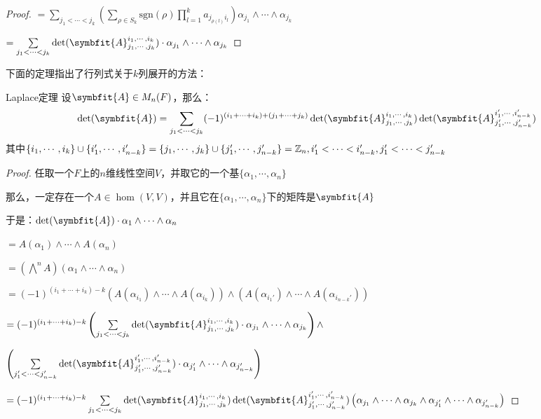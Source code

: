 \documentclass[12pt, a4paper, oneside, UTF8]{ctexbook}
\begin{document}
\begin{para}{0}
\begin{proof}
						$=\sum\limits_{j_1 < \cdots < j_k}\left(\sum\limits_{\rho \in S_k}\text{sgn}(\rho )\prod_{l=1}^{k} a_{j_{\rho(l)}i_l} \right) \alpha_{j_1}\wedge \cdots \wedge \alpha_{j_k}$

						$=\sum\limits_{j_1 < \cdots < j_k}\det(\symbfit{A}_{j_1,\cdots,j_k}^{i_1,\cdots,i_k})\cdot \alpha_{j_1} \wedge \cdots \wedge \alpha_{j_k}$
					\end{proof}
					下面的定理指出了行列式关于$k$列展开的方法：
					\begin{them}{Laplace定理}{}
						设$\symbfit{A} \in M_n(F)$，那么：
						\begin{equation}
							\det(\symbfit{A})=\sum\limits_{j_1 < \cdots < j_k} (-1)^{(i_1+\cdots+i_k)+(j_1+\cdots+j_k)}\det(\symbfit{A}_{j_1,\cdots,j_k}^{i_1,\cdots,i_k})\det(\symbfit{A}_{j_1',\cdots,j_{n-k}'}^{i_1',\cdots,i_{n-k}'})
						\end{equation}
						其中$\{i_1,\cdots,i_k\}\cup \{i_1',\cdots,i_{n-k}'\}=\{j_1,\cdots,j_k\}\cup\{j_1',\cdots,j_{n-k}'\}=\mathbb{Z}_n,i_1'<\cdots<i_{n-k}',j_1'<\cdots<j_{n-k}'$
					\end{them}
					\begin{proof}
						任取一个$F$上的$n$维线性空间$V$，并取它的一个基$\{\alpha_1,\cdots,\alpha_n\}$

						那么，一定存在一个$A \in \hom(V,V)$，并且它在$\{\alpha_1,\cdots,\alpha_n\}$下的矩阵是$\symbfit{A}$
						
						于是：$\det(\symbfit{A})\cdot \alpha_1\wedge \cdots \wedge \alpha_n$

						$=A(\alpha_1)\wedge \cdots \wedge A(\alpha_n)$

						$=\left(\bigwedge^n A\right)(\alpha_1 \wedge \cdots \wedge \alpha_n)$

						$=(-1)^{(i_1+\cdots+i_k)-k}\left(A(\alpha_{i_1})\wedge \cdots \wedge A(\alpha_{i_k})\right)\wedge\left(A(\alpha_{i_1'})\wedge \cdots \wedge A(\alpha_{i_{n-k}'})\right)$

						$=(-1)^{(i_1+\cdots+i_k)-k}\left(\sum\limits_{j_1 < \cdots < j_k}\det(\symbfit{A}_{j_1,\cdots,j_k}^{i_1,\cdots,i_k})\cdot \alpha_{j_1} \wedge \cdots \wedge \alpha_{j_k}\right) \wedge $
						
						$\left(\sum\limits_{j_{1}' < \cdots < j_{n-k}'}\det(\symbfit{A}_{j_1',\cdots,j_{n-k}'}^{i_1',\cdots,i_{n-k}'})\cdot \alpha_{j_1'} \wedge \cdots \wedge \alpha_{j_{n-k}'}\right)$
					
						$=(-1)^{(i_1+\cdots+i_k)-k}\sum\limits_{j_1 < \cdots < j_k}\det(\symbfit{A}_{j_1,\cdots,j_k}^{i_1,\cdots,i_k})\det(\symbfit{A}_{j_1',\cdots,j_{n-k}'}^{i_1',\cdots,i_{n-k}'})\left(\alpha_{j_1} \wedge \cdots \wedge \alpha_{j_k}\wedge \alpha_{j_1'} \wedge \cdots \wedge \alpha_{j_{n-k}'}\right)$


\end{proof}
\end{para}
\end{document}
